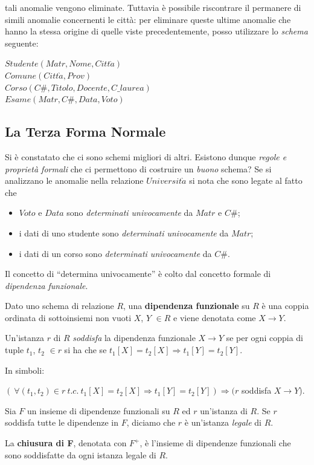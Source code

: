 tali anomalie vengono eliminate. Tuttavia è possibile riscontrare il permanere di simili 
anomalie concernenti le città: per eliminare queste ultime anomalie che hanno la stessa 
origine di quelle viste precedentemente, posso utilizzare lo \emph{schema} seguente:
\begin{center}
  $Studente(Matr,Nome,Citt\grave{a})$\\
  $Comune(Citt\grave{a},Prov)$\\
  $Corso(C\#,Titolo,Docente, C\_laurea)$\\
  $Esame(Matr, C\#, Data,Voto)$
\end{center}

\subsection{La Terza Forma Normale}
Si è constatato che ci sono schemi migliori di altri. Esistono dunque \emph{regole 
e proprietà formali} che ci permettono di costruire un \emph{buono} schema?
Se si analizzano le anomalie nella relazione $Universit\grave{a}$ si nota che sono 
legate al fatto che
\begin{itemize}
 \item $Voto$ e $Data$ sono \emph{determinati univocamente} da $Matr$ e $C\#$;
 \item  i dati di uno studente sono \emph{determinati univocamente} da $Matr$;
 \item i dati di un corso sono \emph{determinati univocamente} da $C\#$.
\end{itemize}
Il concetto di ``determina univocamente'' è colto dal concetto formale di \emph{dipendenza funzionale}.
\begin{defn}
  Dato uno schema di relazione $R$, una \textbf{dipendenza funzionale} su $R$ 
  è una coppia ordinata di sottoinsiemi non vuoti $X$, $Y$ $\in R$ e viene denotata 
  come $X \rightarrow Y$.
\end{defn}

\begin{prop}
Un'istanza $r$ di $R$ \emph{soddisfa} la dipendenza funzionale $X \rightarrow Y$
se per ogni coppia di tuple $t_1$, $t_2$ $\in r$ si ha che se $t_1[X] = t_2[X] 
\Rightarrow t_1[Y] = t_2[Y]$. 
\end{prop}
In simboli:
\begin{center}
\begin{math}
(\ \forall (t_1, t_2) \in r\ t.c.\ t_1[X] = t_2[X] \Rightarrow t_1[Y] = t_2[Y]) 
\Rightarrow (r
\end{math}
soddisfa $X\rightarrow Y$).
\end{center}
Sia $F$ un insieme di dipendenze funzionali su $R$ ed $r$ un'istanza di $R$. Se $r$ 
soddisfa tutte le dipendenze in $F$, diciamo che $r$ è un'istanza \emph{legale} di $R$. 
\begin{defn}
La \textbf{chiusura di F}, denotata con $F^+$, è l'insieme di dipendenze funzionali che 
sono soddisfatte da ogni istanza legale di $R$. 
\end{defn}

